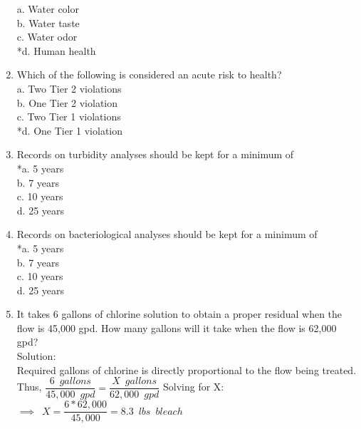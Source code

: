 \begin{enumerate}[1.]
a. Water color\\
b. Water taste\\
c. Water odor\\
*d. Human health\\
\item Which of the following is considered an acute risk to health?\\
a. Two Tier 2 violations\\
b. One Tier 2 violation\\
c. Two Tier 1 violations\\
*d. One Tier 1 violation\\
\item Records on turbidity analyses should be kept for a minimum of\\
*a. 5 years\\
b. 7 years\\
c. 10 years\\
d. 25 years\\
\item Records on bacteriological analyses should be kept for a minimum of\\
*a. 5 years\\
b. 7 years\\
c. 10 years\\
d. 25 years\\
\item It takes 6 gallons of chlorine solution to obtain a proper residual when the flow is 45,000 gpd. How many gallons will it take when the flow is 62,000 gpd?\\
\vspace{0.2cm}
Solution:\\
\vspace{0.2cm}
Required gallons of chlorine is directly proportional to the flow being treated.\\
\vspace{0.2cm}
Thus, $\dfrac{6 \enspace gallons}{45,000 \enspace gpd }=\dfrac{X \enspace gallons}{62,000 \enspace gpd}$
\vspace{0.2cm}
Solving for X:\\
\vspace{0.2cm}
$\implies \enspace X=\dfrac{6*62,000}{45,000}=\boxed{8.3 \enspace lbs \enspace bleach}$
\vspace{0.2cm}


\end{enumerate}
